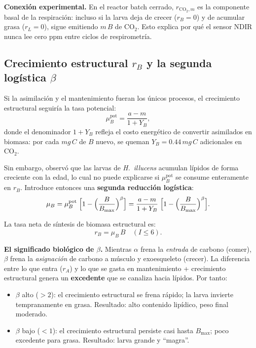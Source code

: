 \textbf{Conexi\'{o}n experimental.} En el reactor batch cerrado, $r_{\mathrm{CO_2},m}$ es la componente basal de la respiraci\'{o}n: incluso si la larva deja de crecer ($r_B = 0$) y de acumular grasa ($r_L = 0$), sigue emitiendo $m\,B$ de $\mathrm{CO_2}$. Esto explica por qu\'{e} el sensor NDIR nunca lee cero ppm entre ciclos de respirometr\'{i}a.

\subsection{Crecimiento estructural $r_B$ y la segunda log\'{i}stica $\beta$}

Si la asimilaci\'{o}n y el mantenimiento fueran los \'{u}nicos procesos, el crecimiento estructural seguir\'{i}a la tasa potencial:
\begin{equation}
    \mu_{B}^{\text{pot}} = \frac{a - m}{1 + Y_B},
    \label{eq:muB_pot}
\end{equation}
donde el denominador $1+Y_B$ refleja el costo energ\'{e}tico de convertir asimilados en biomasa: por cada $\si{mg\,C}$ de $B$ nuevo, se queman $Y_B = \num{0.44}\,\si{mg\,C}$ adicionales en $\mathrm{CO_2}$.

Sin embargo, \textcite{eriksenDynamicModellingFeed2022} observ\'{o} que las larvas de \textit{H.~illucens} acumulan l\'{i}pidos de forma creciente con la edad, lo cual no puede explicarse si $\mu_B^{\text{pot}}$ se consume enteramente en $r_B$. Introduce entonces una \textbf{segunda reducci\'{o}n log\'{i}stica}:
\begin{equation}
    \mu_B = \mu_{B}^{\text{pot}}\;\Bigl[1 - \Bigl(\frac{B}{B_{\max}}\Bigr)^{\beta}\Bigr] = \frac{a - m}{1 + Y_B}\;\Bigl[1 - \Bigl(\frac{B}{B_{\max}}\Bigr)^{\beta}\Bigr].
    \label{eq:muB}
\end{equation}

La tasa neta de s\'{i}ntesis de biomasa estructural es:
\begin{equation}
    r_B = \mu_B\,B \quad (I \le 6).
    \label{eq:rB}
\end{equation}

\textbf{El significado biol\'{o}gico de $\beta$.} Mientras $\alpha$ frena la \emph{entrada} de carbono (comer), $\beta$ frena la \emph{asignaci\'{o}n} de carbono a m\'{u}sculo y exoesqueleto (crecer). La diferencia entre lo que entra ($r_A$) y lo que se gasta en mantenimiento + crecimiento estructural genera un \textbf{excedente} que se canaliza hacia l\'{i}pidos. Por tanto:
\begin{itemize}
    \item $\beta$ alto ($> 2$): el crecimiento estructural se frena r\'{a}pido; la larva invierte tempranamente en grasa. Resultado: alto contenido lip\'{i}dico, peso final moderado.
    \item $\beta$ bajo ($< 1$): el crecimiento estructural persiste casi hasta $B_{\max}$; poco excedente para grasa. Resultado: larva grande y ``magra''.
\end{itemize}


